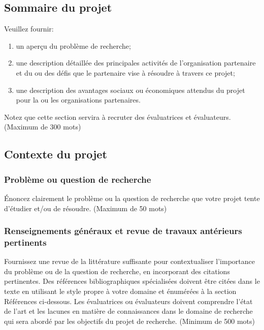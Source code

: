 \documentclass{mitacs-acceleration}
\begin{document}
\renewcommand{\thesubsection}{\arabic{section}.\arabic{subsection}}

\subsection{Sommaire du projet} %

\begin{instructions}
Veuillez fournir:
\begin{enumerate}[label=\alph*)]
    \item un aperçu du problème de recherche;
    \item une description détaillée des principales activités de l'organisation partenaire et du ou des défis que le partenaire vise à résoudre à travers ce projet; 
    \item une description des avantages sociaux ou économiques attendus du projet pour la ou les organisations partenaires.
\end{enumerate}
Notez que cette section servira à recruter des évaluatrices et évaluateurs. (Maximum de 300 mots)
\end{instructions}


\subsection{Contexte du projet} %

\subsubsection{Problème ou question de recherche} %

\begin{instructions}
Énoncez clairement le problème ou la question de recherche que votre projet tente d'étudier et/ou de résoudre. (Maximum de 50 mots)
\end{instructions}


\subsubsection{Renseignements généraux et revue de travaux antérieurs pertinents} %

\begin{instructions}
Fournissez une revue de la littérature suffisante pour contextualiser l'importance du problème ou de la question de recherche, en incorporant des citations pertinentes. Des références bibliographiques spécialisées doivent être citées dans le texte en utilisant le style propre à votre domaine et énumérées à la section \og{}Références\fg{} ci-dessous. Les évaluatrices ou évaluateurs doivent comprendre l'état de l'art et les lacunes en matière de connaissances dans le domaine de recherche qui sera abordé par les objectifs du projet de recherche. (Minimum de 500 mots)
\end{instructions}
\end{document}
